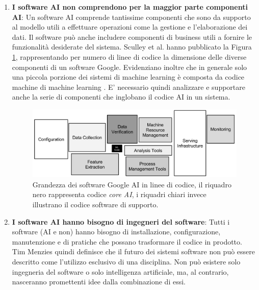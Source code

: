 \begin{enumerate}
    \item \textbf{I software AI non comprendono per la maggior parte componenti AI}: Un software AI comprende tantissime componenti che sono da supporto al modello utili a effettuare operazioni come la gestione e l'elaborazione dei dati. Il software può anche includere componenti di business utili a fornire le funzionalità desiderate del sistema. Sculley et al. hanno pubblicato la Figura \ref{fig:sculley_googlesuite}, rappresentando per numero di linee di codice la dimensione delle diverse componenti di un software Google. Evidenziano inoltre che in generale solo una piccola porzione dei sistemi di machine learning è composta da codice machine di machine learning \cite{sculley2015hidden}. E' necessario quindi analizzare e supportare anche la serie di componenti che inglobano il codice AI in un sistema. \\
    \begin{figure}[h]
        \centering
        \includegraphics[width=\textwidth]{Figure/Background/sculley-googlesuite.png}
        \caption{Grandezza dei software Google AI in linee di codice, il riquadro nero rappresenta codice \textit{core AI}, i riquadri chiari invece illustrano il codice software di supporto. }
        \label{fig:sculley_googlesuite}
    \end{figure}
    \item \textbf{I software AI hanno bisogno di ingegneri del software}: Tutti i software (AI e non) hanno bisogno di installazione, configurazione, manutenzione e di pratiche che possano trasformare il codice in prodotto.
    Tim Menzies quindi definisce che il futuro dei sistemi software non può essere descritto come l'utilizzo esclusivo di una disciplina. Non può esistere solo ingegneria del software o solo intelligenza artificiale, ma, al contrario, nasceranno promettenti idee dalla combinazione di essi.\\

\end{enumerate}
